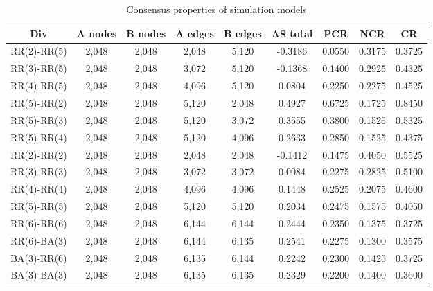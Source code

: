 \begin{table}[!htb]
	\scriptsize
	\centering
    \caption{Consensus properties of simulation models}
	\label{Consensus properties of Simulation Models}
	\begin{center}
		\begin{tabular}{c|c|c|c|c|c|c|c|c} \hline\hline
			Div                    & A nodes& B nodes & A edges & B edges & AS total  & PCR    & NCR    & CR       \\ \hline \hline
			RR(2)-RR(5)            & 2,048  & 2,048   & 2,048   & 5,120   & -0.3186   & 0.0550 & 0.3175 & 0.3725   \\ \hline
			RR(3)-RR(5)            & 2,048  & 2,048   & 3,072   & 5,120   & -0.1368   & 0.1400 & 0.2925 & 0.4325   \\ \hline
			RR(4)-RR(5)            & 2,048  & 2,048   & 4,096   & 5,120   &  0.0804   & 0.2250 & 0.2275 & 0.4525   \\ \hline
			RR(5)-RR(2)            & 2,048 	& 2,048   & 5,120   & 2,048   &  0.4927   & 0.6725 & 0.1725 & 0.8450   \\ \hline	
			RR(5)-RR(3)            & 2,048 	& 2,048   & 5,120   & 3,072   &  0.3555   & 0.3800 & 0.1525 & 0.5325   \\ \hline
			RR(5)-RR(4)            & 2,048  & 2,048   & 5,120   & 4,096   &  0.2633   & 0.2850 & 0.1525 & 0.4375   \\ \hline
			RR(2)-RR(2)            & 2,048  & 2,048   & 2,048   & 2,048   & -0.1412   & 0.1475 & 0.4050 & 0.5525   \\ \hline
			RR(3)-RR(3)            & 2,048  & 2,048   & 3,072   & 3,072   &  0.0084   & 0.2275 & 0.2825 & 0.5100   \\ \hline
			RR(4)-RR(4)            & 2,048  & 2,048   & 4,096   & 4,096   &  0.1448   & 0.2525 & 0.2075 & 0.4600   \\ \hline
			RR(5)-RR(5)            & 2,048  & 2,048   & 5,120   & 5,120   &  0.2034   & 0.2475 & 0.1575 & 0.4050   \\ \hline
			RR(6)-RR(6)            & 2,048  & 2,048   & 6,144   & 6,144   &  0.2444   & 0.2350 & 0.1375 & 0.3725   \\ \hline
			RR(6)-BA(3)            & 2,048 	& 2,048   & 6,144   & 6,135   &  0.2541   & 0.2275 & 0.1300 & 0.3575   \\ \hline 
			BA(3)-RR(6)            & 2,048 	& 2,048   & 6,135   & 6,144   &  0.2242   & 0.2300 & 0.1425 & 0.3725   \\ \hline
			BA(3)-BA(3)            & 2,048 	& 2,048   & 6,135   & 6,135   &  0.2329   & 0.2200 & 0.1400 & 0.3600   \\ \hline

\end{tabular}
\end{center}
\end{table}

